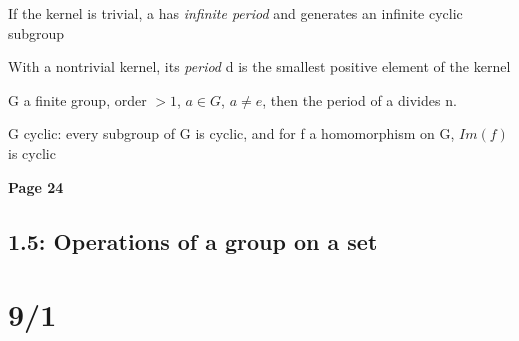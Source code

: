 \documentclass[12pt]{article}
\begin{document}
If the kernel is trivial, a has \textit{infinite period} and generates an infinite cyclic subgroup

With a nontrivial kernel, its \textit{period} d is the smallest positive element of the kernel

\noindent
G a finite group, order $> 1$, $a \in G$, $a \neq e$, then the period of a divides n.

\noindent
G cyclic: every subgroup of G is cyclic, and for f a homomorphism on G, $Im(f)$ is cyclic

\noindent
\textbf{Page 24}

\subsection{1.5: Operations of a group on a set}



\section{9/1}
\end{document}

